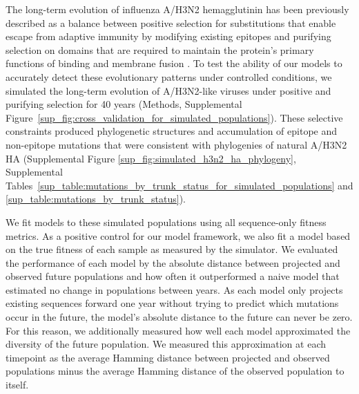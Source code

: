 The long-term evolution of influenza A/H3N2 hemagglutinin has been previously described as a balance between positive selection for substitutions that enable escape from adaptive immunity by modifying existing epitopes and purifying selection on domains that are required to maintain the protein's primary functions of binding and membrane fusion \cite{Bush:1999vj,Neher2013,Luksza:2014hj,Koelle:2015dh}.
To test the ability of our models to accurately detect these evolutionary patterns under controlled conditions, we simulated the long-term evolution of A/H3N2-like viruses under positive and purifying selection for 40 years (Methods, Supplemental Figure~\ref{sup_fig:cross_validation_for_simulated_populations}).
These selective constraints produced phylogenetic structures and accumulation of epitope and non-epitope mutations that were consistent with phylogenies of natural A/H3N2 HA (Supplemental Figure \ref{sup_fig:simulated_h3n2_ha_phylogeny}, Supplemental Tables~\ref{sup_table:mutations_by_trunk_status_for_simulated_populations} and \ref{sup_table:mutations_by_trunk_status}).

We fit models to these simulated populations using all sequence-only fitness metrics.
As a positive control for our model framework, we also fit a model based on the true fitness of each sample as measured by the simulator.
We evaluated the performance of each model by the absolute distance between projected and observed future populations and how often it outperformed a naive model that estimated no change in populations between years.
As each model only projects existing sequences forward one year without trying to predict which mutations occur in the future, the model's absolute distance to the future can never be zero.
For this reason, we additionally measured how well each model approximated the diversity of the future population.
We measured this approximation at each timepoint as the average Hamming distance between projected and observed populations minus the average Hamming distance of the observed population to itself.


